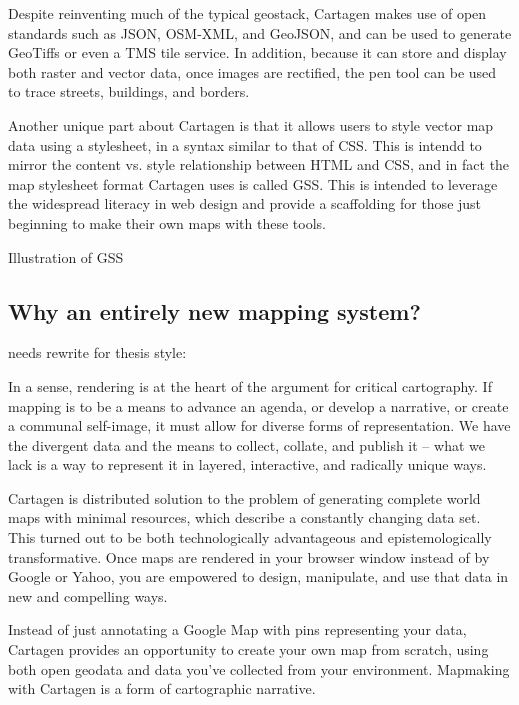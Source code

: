 \documentclass[11pt]{report}
\begin{document}

Despite reinventing much of the typical geostack, Cartagen makes use of open standards such as JSON, OSM-XML, and GeoJSON, and can be used to generate GeoTiffs or even a TMS tile service. In addition, because it can store and display both raster and vector data, once images are rectified, the pen tool can be used to trace streets, buildings, and borders.   

Another unique part about Cartagen is that it allows users to style vector map data using a stylesheet, in a syntax similar to that of CSS. This is intendd to mirror the content vs. style relationship between HTML and CSS, and in fact the map stylesheet format Cartagen uses is called GSS. This is intended to leverage the widespread literacy in web design and provide a scaffolding for those just beginning to make their own maps with these tools. 

Illustration of GSS

\subsection{Why an entirely new mapping system?}

needs rewrite for thesis style:

In a sense, rendering is at the heart of the argument for critical cartography. If mapping is to be a means to advance an agenda, or develop a narrative, or create a communal self-image, it must allow for diverse forms of representation. We have the divergent data and the means to collect, collate, and publish it – what we lack is a way to represent it in layered, interactive, and radically unique ways. 

Cartagen is distributed solution to the problem of generating complete world maps with minimal resources, which describe a constantly changing data set. This turned out to be both technologically advantageous and epistemologically transformative. Once maps are rendered in your browser window instead of by Google or Yahoo, you are empowered to design, manipulate, and use that data in new and compelling ways. 

Instead of just annotating a Google Map with pins representing your data, Cartagen provides an opportunity to create your own map from scratch, using both open geodata and data you've collected from your environment. Mapmaking with Cartagen is a form of cartographic narrative. 
\end{document}
